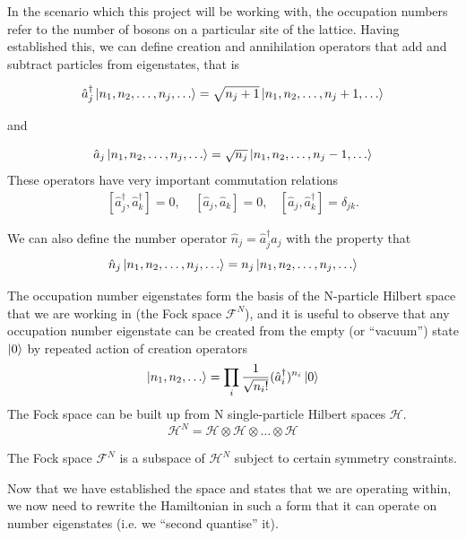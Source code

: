 \documentclass[a4paper,10pt]{article}
\begin{document}
In the scenario which this project will be working with, the occupation numbers refer to the number of bosons on a particular site of the lattice.
Having established this, we can define creation and annihilation operators that add and subtract particles from eigenstates, that is

\begin{equation}
 \hat{a}_{j}^{\dagger}\ket{n_1,n_2,\dots,n_{j},\dots}=\sqrt{n_j+1}\ket{n_1,n_2,\dots,n_{j}+1,\dots}
\end{equation}

and 

\begin{equation}
 \hat{a}_{j}\ket{n_1,n_2,\dots,n_{j},\dots}=\sqrt{n_j}\ket{n_1,n_2,\dots,n_{j}-1,\dots}
\end{equation}
These operators have very important commutation relations
\begin{equation}
\begin{align*}
 [\hat{a}_{j}^{\dagger},\hat{a}_{k}^{\dagger}]=0, \ \ \ \ \ [\hat{a}_{j},\hat{a}_{k}]=0,\ \ \ \ [\hat{a}_{j},\hat{a}_{k}^{\dagger}]=\delta_{jk}.
 \end{align*}
\end{equation}

We can also define the number operator $\hat{n}_j=\hat{a}_{j}^{\dagger}\hat{a}_j$ with the property that
\begin{equation}
 \hat{n}_{j}\ket{n_1,n_2,\dots,n_{j},\dots}=n_{j}\ket{n_1,n_2,\dots,n_{j},\dots}
\end{equation}

The occupation number eigenstates form the basis of the N-particle Hilbert space that we are working in (the Fock space $\mathcal{F}^N$), and it 
is useful to observe that any occupation number eigenstate can be created from the empty (or ``vacuum'') state $\ket{0}$ by repeated action of 
creation operators
\begin{equation}
 \ket{n_1,n_2,\dots}=\prod_i\frac{1}{\sqrt{n_i!}}(\hat{a}_i^{\dagger})^{n_i}\ket{0}
\end{equation}
The Fock space can be built up from N single-particle Hilbert spaces $\mathcal{H}$.
\begin{equation}
 \mathcal{H}^N=\mathcal{H}\otimes \mathcal{H} \otimes \dots\otimes \mathcal{H}
\end{equation}

The Fock space $\mathcal{F}^N$ is a subspace of $\mathcal{H}^N$ subject to certain symmetry constraints.

Now that we have established the space and states that we are operating within, we now need to rewrite the Hamiltonian in such a form that it can operate on number eigenstates (i.e. we 
``second quantise'' it).
\end{document}
